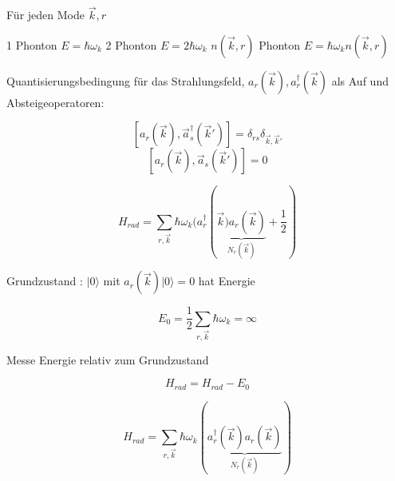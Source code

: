 Für jeden Mode \(\vec k, r\)

1 Phonton \(E= \hbar\omega_k\)
2 Phonton \(E= 2\hbar\omega_k\)
\(n(\vec k,r)\) Phonton \(E= \hbar\omega_k n(\vec k,r)\)


Quantisierungsbedingung für das Strahlungsfeld, \(a_r(\vec k) , a^\dagger_r(\vec k)\) als Auf und Absteigeoperatoren:

\[[a_r(\vec k), \vec a^\dagger_s(\vec k')] = \delta_{rs}\delta_{\vec k,\vec k'}\]
\[[a_r(\vec k), \vec a_s(\vec k')] = 0\]

\[H_{rad} = \sum_{r,\vec k} \hbar\omega_k(a_r^\dagger (\underbrace{\vec k)a_r(\vec k)}_{N_r(\vec k)} +\frac{1}{2})\]

Grundzustand : \(|0\rangle \) mit \(a_r(\vec k) |0\rangle  = 0\) hat Energie

\[ E_0 = \frac{1}{2} \sum_{r,\vec k}\hbar\omega_k = \infty\]

Messe Energie relativ zum Grundzustand 

\[H_{rad} = H_{rad}-E_0\]

\[ H_{rad} = \sum_{r,\vec k} \hbar\omega_k(\underbrace{a_r^\dagger (\vec k)a_r(\vec k)}_{N_r(\vec k)})  \]

